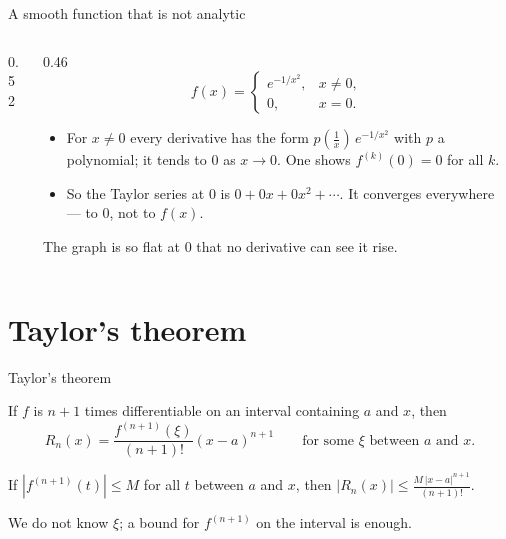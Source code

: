 \documentclass[10pt]{wosm-slides}
\begin{document}
\begin{frame}{A smooth function that is not analytic}
\begin{columns}[c]
\begin{column}{0.52\textwidth}
    \end{column}
    \begin{column}{0.46\textwidth}
      \[ f(x) = \begin{cases} e^{-1/x^2}, & x \ne 0, \\ 0, & x = 0. \end{cases} \]
      \small
      \begin{itemize}
        \item For $x \ne 0$ every derivative has the form $p(\frac1x)\, e^{-1/x^2}$ with $p$ a
          polynomial; it tends to $0$ as $x \to 0$. One shows $f^{(k)}(0) = 0$ for all $k$.
        \item So the Taylor series at $0$ is $0 + 0x + 0x^2 + \cdots$. It converges
          everywhere --- to $0$, not to $f(x)$.
      \end{itemize}
      The graph is so flat at $0$ that no derivative can see it rise.
    \end{column}
  \end{columns}
\end{frame}

\section{Taylor's theorem}

\begin{frame}{Taylor's theorem}
  \begin{theorem}
    If $f$ is $n + 1$ times differentiable on an interval containing $a$ and $x$, then
    \[ R_n(x) = \frac{f^{(n+1)}(\xi)}{(n+1)!} (x - a)^{n+1} \qquad
       \text{for some } \xi \text{ between } a \text{ and } x . \]
  \end{theorem}
  \pause
  \begin{corollary}
    If $|f^{(n+1)}(t)| \le M$ for all $t$ between $a$ and $x$, then
    $|R_n(x)| \le \frac{M\, |x - a|^{n+1}}{(n+1)!}$.
  \end{corollary}
  We do not know $\xi$; a bound for $f^{(n+1)}$ on the interval is enough.
\end{frame}
\end{document}

